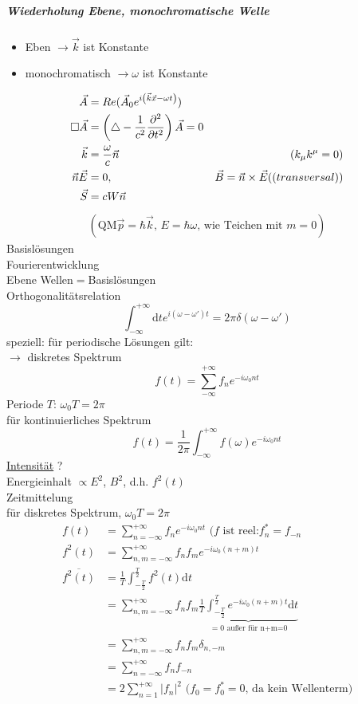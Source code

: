 \documentclass[a4paper]{article}
\newcommand*\laplace{\mathop{}\!\mathbin\bigtriangleup}
\newcommand*\dalembert{\mathop{}\!\mathbin\Box}
\begin{document}
\subparagraph{Wiederholung Ebene, monochromatische Welle}
\begin{itemize}
  \item Eben $\rightarrow \vec{k}$ ist Konstante
  \item monochromatisch $\rightarrow \omega$ ist Konstante
\end{itemize}
\begin{align}
\vec{A}&=Re(\vec{A}_0 e^{i\left(\vec{k}\vec{x}-\omega t\right)})\\
\dalembert \vec{A}&=\left( \laplace -\frac{1}{c^2}\frac{\partial^2}{\partial
t^2} \right)\vec{A}=0\\
\vec{k}&=\frac{\omega}{c}\vec{n} &\left( k_\mu k^\mu=0 \right)\\
\vec{n}\vec{E}&=0, &\vec{B}=\vec{n}\times\vec{E} \text(  (transversal))\\
\vec{S}&=cW\vec{n}
\end{align}
\begin{align}
\left( \text{QM} \vec{p}=\hbar\vec{k}\text{, }E=\hbar\omega \text{, wie Teichen
mit }m=0 \right)
\end{align}
Basislösungen\\
Fourierentwicklung\\
Ebene Wellen$=$Basislösungen\\
Orthogonalitätsrelation
\begin{equation}
\int_{-\infty}^{+\infty} \mathrm{d}t e^{i(\omega-\omega')t}=2\pi\delta(\omega-\omega')
\end{equation}
speziell: für periodische Lösungen gilt:\\
$\rightarrow$ diskretes Spektrum
\begin{equation}
f(t)=\sum_{-\infty}^{+\infty} f_n  e^{-i\omega_0 n t}
\end{equation}
Periode $T$: $\omega_0 T=2\pi$\\
für kontinuierliches Spektrum
\begin{equation}
f(t)=\frac{1}{2\pi}\int_{-\infty}^{+\infty} f(\omega)  e^{-i\omega_0 n t}
\end{equation} 
\underline{Intensität} ?\\
Energieinhalt $\propto E^2$, $B^2$, d.h. $f^2(t)$\\
Zeitmittelung\\
für diskretes Spektrum, $\omega_0 T=2\pi$
\begin{align}
f(t)&=\sum_{n=-\infty}^{+\infty} f_n  e^{-i\omega_0 n t} \text{  (}f \text{ ist
reel:}f_n^*=f_{-n}\\
f^2(t)&=\sum_{n,m=-\infty}^{+\infty} f_n f_m  e^{-i\omega_0 (n+m) t}\\
\overline{f^2(t)}&=\frac{1}{T} \int_{-\frac{T}{2}}^{\frac{T}{2}} f^2(t) \mathrm{d}t\\
&=\sum_{n,m=-\infty}^{+\infty} f_n f_m \underbrace{\frac{1}{T}
\int_{-\frac{T}{2}}^{\frac{T}{2}} e^{-i\omega_0 (n+m) t}\mathrm{d}t}_{=0 \text{ außer
für n+m=0}}\\
&=\sum_{n,m=-\infty}^{+\infty} f_n f_m \delta_{n,-m}\\
&=\sum_{n=-\infty}^{+\infty} f_n f_{-n}\\
&=2\sum_{n=1}^{+\infty} |f_n|^2 \text{ (} f_0=f_0^*=0\text{, da kein
Wellenterm)}
\end{align}
\end{document}
